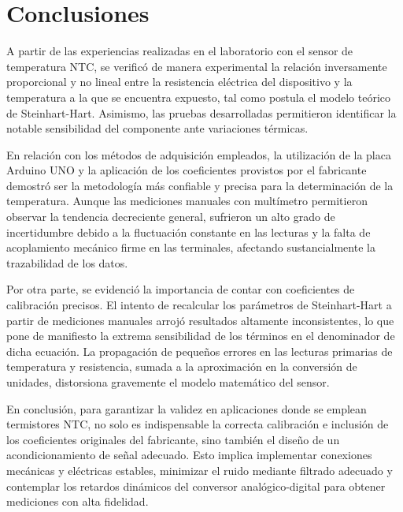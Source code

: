 \section{Conclusiones}


A partir de las experiencias realizadas en el laboratorio con el sensor de temperatura NTC, se verificó de manera experimental la relación inversamente proporcional y no lineal entre la resistencia eléctrica del dispositivo y la temperatura a la que se encuentra expuesto, tal como postula el modelo teórico de Steinhart-Hart. Asimismo, las pruebas desarrolladas permitieron identificar la notable sensibilidad del componente ante variaciones térmicas.

En relación con los métodos de adquisición empleados, la utilización de la placa Arduino UNO y la aplicación de los coeficientes provistos por el fabricante demostró ser la metodología más confiable y precisa para la determinación de la temperatura. Aunque las mediciones manuales con multímetro permitieron observar la tendencia decreciente general, sufrieron un alto grado de incertidumbre debido a la fluctuación constante en las lecturas y la falta de acoplamiento mecánico firme en las terminales, afectando sustancialmente la trazabilidad de los datos.

Por otra parte, se evidenció la importancia de contar con coeficientes de calibración precisos. El intento de recalcular los parámetros de Steinhart-Hart a partir de mediciones manuales arrojó resultados altamente inconsistentes, lo que pone de manifiesto la extrema sensibilidad de los términos en el denominador de dicha ecuación. La propagación de pequeños errores en las lecturas primarias de temperatura y resistencia, sumada a la aproximación en la conversión de unidades, distorsiona gravemente el modelo matemático del sensor.

En conclusión, para garantizar la validez en aplicaciones donde se emplean termistores NTC, no solo es indispensable la correcta calibración e inclusión de los coeficientes originales del fabricante, sino también el diseño de un acondicionamiento de señal adecuado. Esto implica implementar conexiones mecánicas y eléctricas estables, minimizar el ruido mediante filtrado adecuado y contemplar los retardos dinámicos del conversor analógico-digital para obtener mediciones con alta fidelidad.

